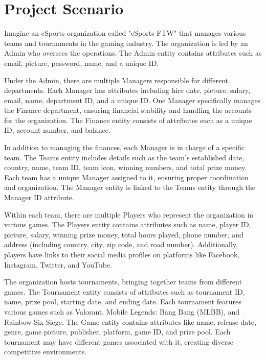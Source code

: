 \clearpage

\section{Project Scenario}
\hrulefill
\vspace*{12pt}

Imagine an eSports organization called "eSports FTW" that manages various teams and tournaments in the gaming industry. The organization is led by an Admin who oversees the operations. The Admin entity contains attributes such as email, picture, password, name, and a unique ID.

Under the Admin, there are multiple Managers responsible for different departments. Each Manager has attributes including hire date, picture, salary, email, name, department ID, and a unique ID. One Manager specifically manages the Finance department, ensuring financial stability and handling the accounts for the organization. The Finance entity consists of attributes such as a unique ID, account number, and balance.

In addition to managing the finances, each Manager is in charge of a specific team. The Teams entity includes details such as the team's established date, country, name, team ID, team icon, winning numbers, and total prize money. Each team has a unique Manager assigned to it, ensuring proper coordination and organization. The Manager entity is linked to the Teams entity through the Manager ID attribute.

Within each team, there are multiple Players who represent the organization in various games. The Players entity contains attributes such as name, player ID, picture, salary, winning prize money, total hours played, phone number, and address (including country, city, zip code, and road number). Additionally, players have links to their social media profiles on platforms like Facebook, Instagram, Twitter, and YouTube.

The organization hosts tournaments, bringing together teams from different games. The Tournament entity consists of attributes such as tournament ID, name, prize pool, starting date, and ending date. Each tournament features various games such as Valorant, Mobile Legends: Bang Bang (MLBB), and Rainbow Six Siege. The Game entity contains attributes like name, release date, genre, game picture, publisher, platform, game ID, and prize pool. Each tournament may have different games associated with it, creating diverse competitive environments.

